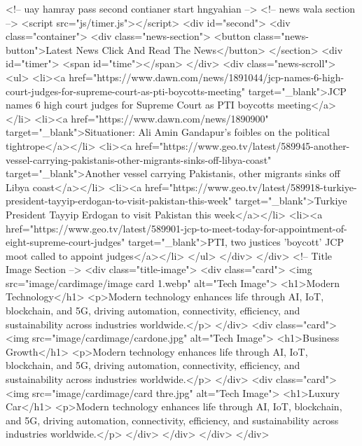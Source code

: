     <!-- uay hamray pass second contianer start hngyahian -->
    <!-- news wala section -->
    <script src="js/timer.js"></script>
    <div id="second">
        <div class="container">
            <div class="news-section">
                <button class="news-button">Latest News Click And Read The News</button>
                </section>
                <div id="timer">
                    <span id="time"></span>
                </div>
                <div class="news-scroll">
                    <ul>
                        <li><a href="https://www.dawn.com/news/1891044/jcp-names-6-high-court-judges-for-supreme-court-as-pti-boycotts-meeting" target="_blank">JCP names 6 high court judges for Supreme Court as PTI boycotts meeting</a></li>
                        <li><a href="https://www.dawn.com/news/1890900" target="_blank">Situationer: Ali Amin Gandapur’s foibles on the political tightrope</a></li>
                        <li><a href="https://www.geo.tv/latest/589945-another-vessel-carrying-pakistanis-other-migrants-sinks-off-libya-coast" target="_blank">Another vessel carrying Pakistanis, other migrants sinks off Libya coast</a></li>
                        <li><a href="https://www.geo.tv/latest/589918-turkiye-president-tayyip-erdogan-to-visit-pakistan-this-week" target="_blank">Turkiye President Tayyip Erdogan to visit Pakistan this week</a></li>
                        <li><a href="https://www.geo.tv/latest/589901-jcp-to-meet-today-for-appointment-of-eight-supreme-court-judges" target="_blank">PTI, two justices 'boycott' JCP moot called to appoint judges</a></li>
                    </ul>
                </div>
            </div>
            <!-- Title Image Section -->
            <div class="title-image">
                <div class="card">
                    <img src="image/cardimage/image card 1.webp" alt="Tech Image">
                    <h1>Modern Technology</h1>
                    <p>Modern technology enhances life through AI, IoT, blockchain, and 5G, driving automation, connectivity, efficiency, and sustainability across industries worldwide.</p>
                </div>
                <div class="card">
                    <img src="image/cardimage/cardone.jpg" alt="Tech Image">
                    <h1>Business Growth</h1>
                    <p>Modern technology enhances life through AI, IoT, blockchain, and 5G, driving automation, connectivity, efficiency, and sustainability across industries worldwide.</p>
                </div>
                <div class="card">
                    <img src="image/cardimage/card thre.jpg" alt="Tech Image">
                    <h1>Luxury Car</h1>
                    <p>Modern technology enhances life through AI, IoT, blockchain, and 5G, driving automation, connectivity, efficiency, and sustainability across industries worldwide.</p>
                </div>
            </div>
        </div>
    </div>




